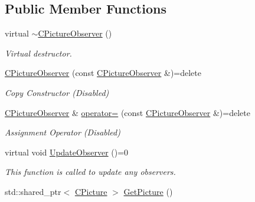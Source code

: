 \subsection*{Public Member Functions}
\begin{DoxyCompactItemize}
\item 
virtual \hyperlink{class_c_picture_observer_a86036f6ad66ae4bad3f204f61d234f46}{$\sim$\+C\+Picture\+Observer} ()
\begin{DoxyCompactList}\small\item\em Virtual destructor. \end{DoxyCompactList}\item 
\hypertarget{class_c_picture_observer_a7c0cae97a7c165b98a00aeb2892cd6e7}{\hyperlink{class_c_picture_observer_a7c0cae97a7c165b98a00aeb2892cd6e7}{C\+Picture\+Observer} (const \hyperlink{class_c_picture_observer}{C\+Picture\+Observer} \&)=delete}\label{class_c_picture_observer_a7c0cae97a7c165b98a00aeb2892cd6e7}

\begin{DoxyCompactList}\small\item\em Copy Constructor (Disabled) \end{DoxyCompactList}\item 
\hypertarget{class_c_picture_observer_a200c66fe9ab13e18e9559033165b1895}{\hyperlink{class_c_picture_observer}{C\+Picture\+Observer} \& \hyperlink{class_c_picture_observer_a200c66fe9ab13e18e9559033165b1895}{operator=} (const \hyperlink{class_c_picture_observer}{C\+Picture\+Observer} \&)=delete}\label{class_c_picture_observer_a200c66fe9ab13e18e9559033165b1895}

\begin{DoxyCompactList}\small\item\em Assignment Operator (Disabled) \end{DoxyCompactList}\item 
\hypertarget{class_c_picture_observer_a0dce27216a8cb8a2490f0efc83a5994a}{virtual void \hyperlink{class_c_picture_observer_a0dce27216a8cb8a2490f0efc83a5994a}{Update\+Observer} ()=0}\label{class_c_picture_observer_a0dce27216a8cb8a2490f0efc83a5994a}

\begin{DoxyCompactList}\small\item\em This function is called to update any observers. \end{DoxyCompactList}\item 
\hypertarget{class_c_picture_observer_ab7613c4badd101ace6a992b2eaaea153}{std\+::shared\+\_\+ptr$<$ \hyperlink{class_c_picture}{C\+Picture} $>$ \hyperlink{class_c_picture_observer_ab7613c4badd101ace6a992b2eaaea153}{Get\+Picture} ()}\label{class_c_picture_observer_ab7613c4badd101ace6a992b2eaaea153}


\end{DoxyCompactItemize}
